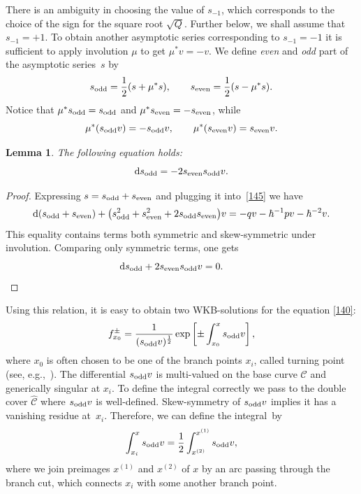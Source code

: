 \documentclass[pdftex]{sigma}
\numberwithin{equation}{section}
\newtheorem{Lemma}[Theorem]{Lemma}
\theoremstyle{definition}
\begin{document}
There is an ambiguity in choosing the value of $s_{-1}$, which corresponds to the choice of the sign for the square root $\sqrt{Q}$. Further below, we shall assume that $s_{-1}=+1$. To obtain another asymptotic series corresponding to $s_{-1}=-1$ it is sufficient to apply involution $\mu$ to get $\mu^*v=-v$. We define \textit{even} and \textit{odd} part of the asymptotic series~$s$ by
\begin{equation*}%
s_{\rm odd}=\frac{1}{2}(s +\mu^*s ), \qquad s_{\rm even}=\frac{1}{2}(s -\mu^*s ).
\end{equation*}
Notice that $\mu^*s_{\rm odd}=s_{\rm odd}$ and $\mu^*s_{\rm even}=-s_{\rm even} $,
while
\begin{equation*}%
\mu^*(s_{\rm odd}v)=-s_{\rm odd}v, \qquad \mu^*(s_{\rm even}v)=s_{\rm even}v.
\end{equation*}

\begin{Lemma}
The following equation holds:
\begin{equation*}%
{\rm d} s_{\rm odd}=- 2s_{\rm even} s_{\rm odd}v .
\end{equation*}
\end{Lemma}
\begin{proof}
Expressing $s=s_{\rm odd}+s_{\rm even}$ and plugging it into~\eqref{145} we have
\begin{equation*}%
{\rm d}(s_{\rm odd}+s_{\rm even})+\big(s^2_{\rm odd} + s^2_{\rm even} + 2s_{\rm odd}s_{\rm even}\big)v=-qv-\hbar^{-1}pv-\hbar^{-2}v.
\end{equation*}
This equality contains terms both symmetric and skew-symmetric under involution. Comparing only symmetric terms, one gets
\begin{equation*}%
{\rm d} s_{\rm odd}+2 s_{\rm even} s_{\rm odd}v=0 .\tag*{\qed}
\end{equation*} \renewcommand{\qed}{}
\end{proof}

Using this relation, it is easy to obtain two WKB-solutions for the equation \eqref{140}:
\begin{equation}\label{154}f^{\pm}_{x_0}=\frac{1}{(s_{\rm odd}v)^{\frac{1}{2}}}\exp \left[\pm \int^{x}_{x_0}s_{\rm odd}v \right],\end{equation}
where $x_0$ is often chosen to be one of the branch points $x_i$, called turning point (see, e.g.,~\cite{kawai2005algebraic}). The differential $s_{\rm odd}v$ is multi-valued on the base curve $\mathcal{C}$ and generically singular at $x_i$. To define the integral correctly we pass to the double cover $\hat{\mathcal{C}}$ where $s_{\rm odd}v$ is well-defined. Skew-symmetry of $s_{\rm odd}v$ implies it has a vanishing residue at~$x_i$. Therefore, we can define the integral~by%
\begin{equation*}%
\int^x_{x_i}s_{\rm odd}v=\frac{1}{2}\int^{x^{(1)}}_{x^{(2)}}s_{\rm odd}v,\end{equation*}
where we join preimages $x^{(1)}$ and $x^{(2)}$ of $x$ by an arc passing through the branch cut, which connects $x_i$ with some another branch point.
\end{document}
